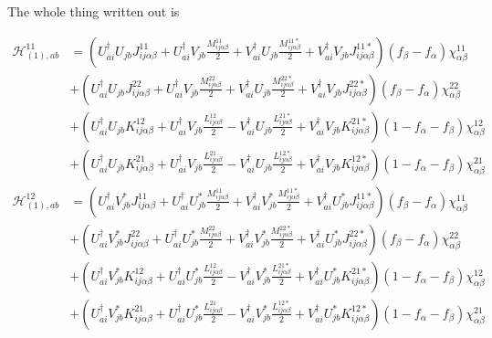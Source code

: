 The whole thing written out is

\begin{align}
\mathcal{H}_{(1),ab}^{11} 
&= \left(U_{ai}^\dagger U_{jb} J_{ij\alpha\beta}^{11} + U_{ai}^\dagger V_{jb} \frac{M_{ij\alpha\beta}^{11}}{2} + V_{ai}^\dagger U_{jb} \frac{M_{ij\alpha\beta}^{11*}}{2} + V_{ai}^\dagger V_{jb} J_{ij\alpha\beta}^{11*}  \right)(f_\beta-f_\alpha)\chi^{11}_{\alpha\beta}                   \\
&+ \left(U_{ai}^\dagger U_{jb} J_{ij\alpha\beta}^{22} + U_{ai}^\dagger V_{jb} \frac{M_{ij\alpha\beta}^{22}}{2} + V_{ai}^\dagger U_{jb} \frac{M_{ij\alpha\beta}^{22*}}{2} + V_{ai}^\dagger V_{jb} J_{ij\alpha\beta}^{22*}  \right)(f_\beta-f_\alpha)\chi^{22}_{\alpha\beta}                   \\
&+ \left(U_{ai}^\dagger U_{jb} K_{ij\alpha\beta}^{12} + U_{ai}^\dagger V_{jb} \frac{L_{ij\alpha\beta}^{12}}{2} - V_{ai}^\dagger U_{jb} \frac{L_{ij\alpha\beta}^{21*}}{2} + V_{ai}^\dagger V_{jb} K_{ij\alpha\beta}^{21*}  \right)\left(1-f_\alpha-f_\beta\right)\chi^{12}_{\alpha\beta}      \\
&+ \left(U_{ai}^\dagger U_{jb} K_{ij\alpha\beta}^{21} + U_{ai}^\dagger V_{jb} \frac{L_{ij\alpha\beta}^{21}}{2} - V_{ai}^\dagger U_{jb} \frac{L_{ij\alpha\beta}^{12*}}{2} + V_{ai}^\dagger V_{jb} K_{ij\alpha\beta}^{12*}  \right)\left(1-f_\alpha-f_\beta\right)\chi^{21}_{\alpha\beta}
\end{align}
\begin{align}
\mathcal{H}_{(1),ab}^{12} 
&= \left(U_{ai}^\dagger V^*_{jb} J_{ij\alpha\beta}^{11} + U_{ai}^\dagger U^*_{jb} \frac{M_{ij\alpha\beta}^{11}}{2} + V_{ai}^\dagger V^*_{jb} \frac{M_{ij\alpha\beta}^{11*}}{2} + V_{ai}^\dagger U^*_{jb} J_{ij\alpha\beta}^{11*}  \right)(f_\beta-f_\alpha)\chi^{11}_{\alpha\beta}                   \\
&+ \left(U_{ai}^\dagger V^*_{jb} J_{ij\alpha\beta}^{22} + U_{ai}^\dagger U^*_{jb} \frac{M_{ij\alpha\beta}^{22}}{2} + V_{ai}^\dagger V^*_{jb} \frac{M_{ij\alpha\beta}^{22*}}{2} + V_{ai}^\dagger U^*_{jb} J_{ij\alpha\beta}^{22*}  \right)(f_\beta-f_\alpha)\chi^{22}_{\alpha\beta}                   \\
&+ \left(U_{ai}^\dagger V^*_{jb} K_{ij\alpha\beta}^{12} + U_{ai}^\dagger U^*_{jb} \frac{L_{ij\alpha\beta}^{12}}{2} - V_{ai}^\dagger V^*_{jb} \frac{L_{ij\alpha\beta}^{21*}}{2} + V_{ai}^\dagger U^*_{jb} K_{ij\alpha\beta}^{21*}  \right)\left(1-f_\alpha-f_\beta\right)\chi^{12}_{\alpha\beta}      \\
&+ \left(U_{ai}^\dagger V^*_{jb} K_{ij\alpha\beta}^{21} + U_{ai}^\dagger U^*_{jb} \frac{L_{ij\alpha\beta}^{21}}{2} - V_{ai}^\dagger V^*_{jb} \frac{L_{ij\alpha\beta}^{12*}}{2} + V_{ai}^\dagger U^*_{jb} K_{ij\alpha\beta}^{12*}  \right)\left(1-f_\alpha-f_\beta\right)\chi^{21}_{\alpha\beta}
\end{align}
